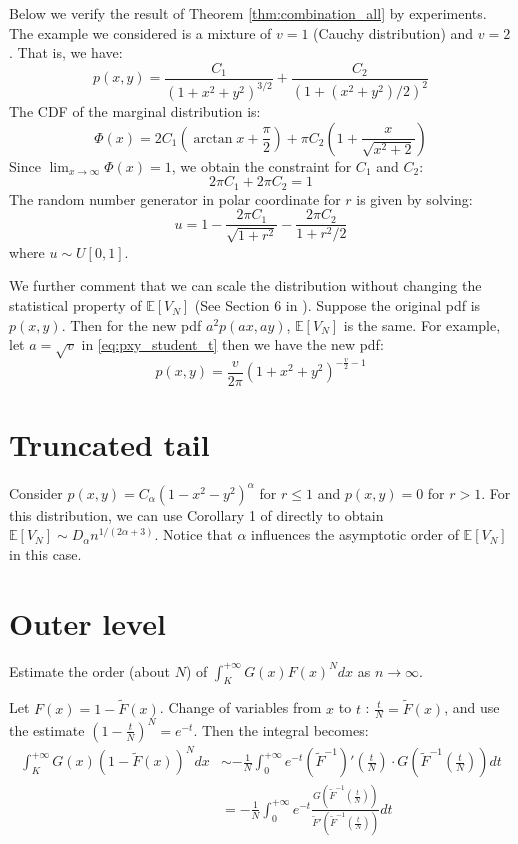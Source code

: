 \documentclass{article}
\def\E{\mathbb{E}}
\begin{document}
Below we verify the result of Theorem \ref{thm:combination_all}
by experiments. The example we considered is a mixture of $v=1$
(Cauchy distribution) and $v=2$. That is, we have:
\begin{equation}
    p(x,y) = \frac{C_1}{(1+x^2+y^2)^{3/2}}
    + \frac{C_2}{(1+(x^2+y^2)/2)^{2}}
\end{equation}
The CDF of the marginal distribution is:
\begin{equation}
    \Phi(x) = 2C_1 (\arctan x + \frac{\pi}{2})
    + \pi C_2 (1 + \frac{x}{\sqrt{x^2 + 2}})
\end{equation}
Since $\lim_{x\to \infty} \Phi(x) = 1$,
we obtain the constraint for $C_1$ and $C_2$:
\begin{equation}
2\pi C_1 + 2 \pi C_2 = 1    
\end{equation}
The random number generator in polar coordinate
for $r$ is given by solving:
\begin{equation}
    u = 1 - \frac{2\pi C_1}{\sqrt{1+r^2}} - \frac{2\pi C_2}{1+r^2/2}
\end{equation}
where $u\sim U[0,1]$.

We further comment that we can scale the distribution
without changing the statistical property of $\E[V_N]$
(See Section 6 in \cite{efron1965convex}).
Suppose the original pdf is $p(x,y)$. Then for the new
pdf $a^2 p(ax, ay)$, $\E[V_N]$ is the same.
For example,  let $a=\sqrt{v}$ in 
\eqref{eq:pxy_student_t} then we have the new
pdf:
\begin{equation}
    p(x,y)= \frac{v}{2\pi}(1+x^2+y^2)^{-\frac{v}{2}-1}
\end{equation}

\section{Truncated tail}
Consider  $p(x,y) = C_{\alpha}(1-x^2-y^2)^{\alpha}$ for $r\leq 1$
and $p(x,y)=0$ for $r>1$.
For this distribution, we can use
Corollary 1 of \cite{affentranger1991convex}
directly to obtain
$\E[V_N] \sim D_{\alpha} n^{1/(2\alpha + 3)}$.
Notice that $\alpha$ influences the asymptotic order of
$\E[V_N]$ in this case.

\section{Outer level}
Estimate the order (about $N$)
of $\int_K^{+\infty} G(x)
F(x)^N dx
$ as $n\to \infty$.

Let $F(x)=1-\widetilde{F}(x)$.
Change of variables from $x$ to $t$
: $\frac{t}{N} = \widetilde{F}(x)$,
and use the estimate $(1-\frac{t}{N})^N
=e^{-t}$.
Then the integral becomes:
\begin{align*}
    \int_K^{+\infty} G(x)
(1-\widetilde{F}(x))^N dx
&\sim -\frac{1}{N}\int_0^{+\infty}
e^{-t} (\widetilde{F}^{-1})'(\frac{t}{N})
\cdot G(\widetilde{F}^{-1}(\frac{t}{N}))dt \\
&=
-\frac{1}{N}\int_0^{+\infty}
e^{-t} 
\frac
{G(\widetilde{F}^{-1}(\frac{t}{N}))
}
{
\widetilde{F}'
\left(\widetilde{F}^{-1}(\frac{t}{N})
\right)
}dt 
\end{align*}
\end{document}
